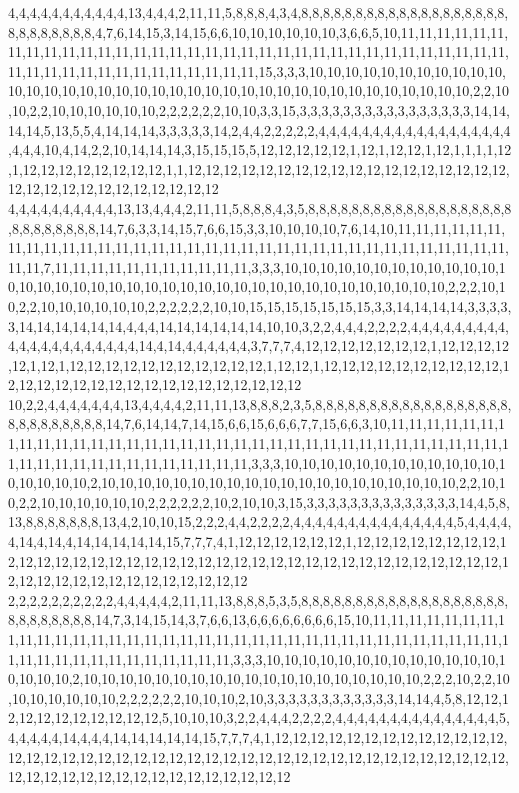 4,4,4,4,4,4,4,4,4,4,4,13,4,4,4,2,11,11,5,8,8,8,4,3,4,8,8,8,8,8,8,8,8,8,8,8,8,8,8,8,8,8,8,8,8,8,8,8,8,8,8,8,4,7,6,14,15,3,14,15,6,6,10,10,10,10,10,10,3,6,6,5,10,11,11,11,11,11,11,11,11,11,11,11,11,11,11,11,11,11,11,11,11,11,11,11,11,11,11,11,11,11,11,11,11,11,11,11,11,11,11,11,11,11,11,11,11,11,11,11,11,15,3,3,3,10,10,10,10,10,10,10,10,10,10,10,10,10,10,10,10,10,10,10,10,10,10,10,10,10,10,10,10,10,10,10,10,10,10,10,10,10,2,2,10,10,2,2,10,10,10,10,10,10,2,2,2,2,2,2,10,10,3,3,15,3,3,3,3,3,3,3,3,3,3,3,3,3,3,3,3,14,14,14,14,5,13,5,5,4,14,14,14,3,3,3,3,3,14,2,4,4,2,2,2,2,2,4,4,4,4,4,4,4,4,4,4,4,4,4,4,4,4,4,4,4,4,4,10,4,14,2,2,10,14,14,14,3,15,15,15,5,12,12,12,12,12,1,12,1,12,12,1,12,1,1,1,1,12,1,12,12,12,12,12,12,12,12,1,1,12,12,12,12,12,12,12,12,12,12,12,12,12,12,12,12,12,12,12,12,12,12,12,12,12,12,12,12,12,12
4,4,4,4,4,4,4,4,4,4,13,13,4,4,4,2,11,11,5,8,8,8,4,3,5,8,8,8,8,8,8,8,8,8,8,8,8,8,8,8,8,8,8,8,8,8,8,8,8,8,8,8,14,7,6,3,3,14,15,7,6,6,15,3,3,10,10,10,10,7,6,14,10,11,11,11,11,11,11,11,11,11,11,11,11,11,11,11,11,11,11,11,11,11,11,11,11,11,11,11,11,11,11,11,11,11,11,11,11,7,11,11,11,11,11,11,11,11,11,11,11,3,3,3,10,10,10,10,10,10,10,10,10,10,10,10,10,10,10,10,10,10,10,10,10,10,10,10,10,10,10,10,10,10,10,10,10,10,10,10,10,2,2,2,10,10,2,2,10,10,10,10,10,10,2,2,2,2,2,2,10,10,15,15,15,15,15,15,15,3,3,14,14,14,14,3,3,3,3,3,14,14,14,14,14,14,4,4,4,14,14,14,14,14,14,10,10,3,2,2,4,4,4,2,2,2,2,4,4,4,4,4,4,4,4,4,4,4,4,4,4,4,4,4,4,4,4,4,14,4,14,4,4,4,4,4,4,3,7,7,7,4,12,12,12,12,12,12,12,1,12,12,12,12,12,1,12,1,12,12,12,12,12,12,12,12,12,12,12,1,12,12,1,12,12,12,12,12,12,12,12,12,12,12,12,12,12,12,12,12,12,12,12,12,12,12,12,12,12,12
10,2,2,4,4,4,4,4,4,4,13,4,4,4,4,2,11,11,13,8,8,8,2,3,5,8,8,8,8,8,8,8,8,8,8,8,8,8,8,8,8,8,8,8,8,8,8,8,8,8,8,8,14,7,6,14,14,7,14,15,6,6,15,6,6,6,7,7,15,6,6,3,10,11,11,11,11,11,11,11,11,11,11,11,11,11,11,11,11,11,11,11,11,11,11,11,11,11,11,11,11,11,11,11,11,11,11,11,11,11,11,11,11,11,11,11,11,11,11,11,11,3,3,3,10,10,10,10,10,10,10,10,10,10,10,10,10,10,10,10,10,2,10,10,10,10,10,10,10,10,10,10,10,10,10,10,10,10,10,10,10,10,2,2,10,10,2,2,10,10,10,10,10,10,2,2,2,2,2,2,10,2,10,10,3,15,3,3,3,3,3,3,3,3,3,3,3,3,3,3,14,4,5,8,13,8,8,8,8,8,8,8,13,4,2,10,10,15,2,2,2,4,4,2,2,2,2,4,4,4,4,4,4,4,4,4,4,4,4,4,4,4,5,4,4,4,4,4,14,4,14,4,14,14,14,14,14,15,7,7,7,4,1,12,12,12,12,12,12,1,12,12,12,12,12,12,12,12,12,12,12,12,12,12,12,12,12,12,12,12,12,12,12,12,12,12,12,12,12,12,12,12,12,12,12,12,12,12,12,12,12,12,12,12,12,12,12,12,12,12
2,2,2,2,2,2,2,2,2,2,4,4,4,4,4,2,11,11,13,8,8,8,5,3,5,8,8,8,8,8,8,8,8,8,8,8,8,8,8,8,8,8,8,8,8,8,8,8,8,8,8,8,14,7,3,14,15,14,3,7,6,6,13,6,6,6,6,6,6,6,6,15,10,11,11,11,11,11,11,11,11,11,11,11,11,11,11,11,11,11,11,11,11,11,11,11,11,11,11,11,11,11,11,11,11,11,11,11,11,11,11,11,11,11,11,11,11,11,11,11,11,3,3,3,10,10,10,10,10,10,10,10,10,10,10,10,10,10,10,10,10,2,10,10,10,10,10,10,10,10,10,10,10,10,10,10,10,10,10,10,10,2,2,2,10,2,2,10,10,10,10,10,10,10,2,2,2,2,2,2,10,10,10,2,10,3,3,3,3,3,3,3,3,3,3,3,3,14,14,4,5,8,12,12,12,12,12,12,12,12,12,12,12,5,10,10,10,3,2,2,4,4,4,2,2,2,2,4,4,4,4,4,4,4,4,4,4,4,4,4,4,4,5,4,4,4,4,4,14,4,4,4,14,14,14,14,14,15,7,7,7,4,1,12,12,12,12,12,12,12,12,12,12,12,12,12,12,12,12,12,12,12,12,12,12,12,12,12,12,12,12,12,12,12,12,12,12,12,12,12,12,12,12,12,12,12,12,12,12,12,12,12,12,12,12,12,12,12,12,12
